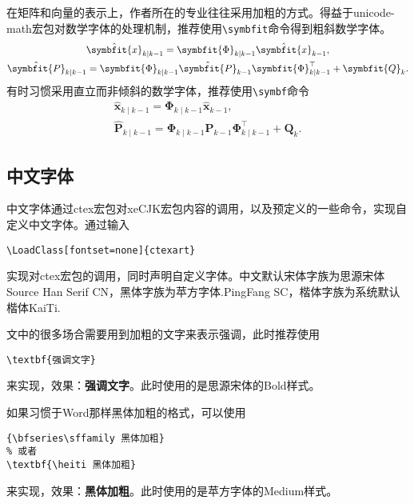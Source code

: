 \documentclass{gunote}
\newcommand{\cmd}[1]{\texttt{\backslash #1}}
\def\mbi{\symbfit}
\def\mbu{\symbf}
\begin{document}
在矩阵和向量的表示上，作者所在的专业往往采用加粗的方式。得益于\textsf{unicode-math}宏包对数学字体的处理机制，推荐使用\cmd{symbfit}命令得到粗斜数学字体。
\begin{gather}
  \hat{\mbi{x}}_{k\mid k-1}=\mbi{\Phi}_{k\mid k-1}\hat{\mbi{x}}_{k-1},\\
  \hat{\mbi{P}}_{k\mid k-1}=\mbi{\Phi}_{k\mid k-1}\hat{\mbi{P}}_{k-1}\mbi{\Phi}_{k\mid k-1}^\top+\mbi{Q}_k.
\end{gather}
有时习惯采用直立而非倾斜的数学字体，推荐使用\cmd{symbf}命令
\begin{gather}
  \hat{\mbu{x}}_{k\mid k-1}=\mbu{\Phi}_{k\mid k-1}\hat{\mbu{x}}_{k-1},\\
  \hat{\mbu{P}}_{k\mid k-1}=\mbu{\Phi}_{k\mid k-1}\hat{\mbu{P}}_{k-1}\mbu{\Phi}_{k\mid k-1}^\top+\mbu{Q}_k.
\end{gather}
\subsection{中文字体}
中文字体通过\textsf{ctex}宏包对\textsf{xeCJK}宏包内容的调用，以及预定义的一些命令，实现自定义中文字体。通过输入
\begin{verbatim}
\LoadClass[fontset=none]{ctexart}
\end{verbatim}
实现对\textsf{ctex}宏包的调用，同时声明自定义字体。中文默认宋体字族为思源宋体Source Han Serif CN，黑体字族为苹方字体.PingFang SC，楷体字族为系统默认楷体KaiTi.

文中的很多场合需要用到加粗的文字来表示强调，此时推荐使用
\begin{verbatim}
\textbf{强调文字}
\end{verbatim}
来实现，效果：\textbf{强调文字}。此时使用的是思源宋体的Bold样式。

如果习惯于Word那样黑体加粗的格式，可以使用
\begin{verbatim}
{\bfseries\sffamily 黑体加粗}
% 或者
\textbf{\heiti 黑体加粗}
\end{verbatim}
来实现，效果：{\bfseries\sffamily 黑体加粗}。此时使用的是苹方字体的Medium样式。
\end{document}
